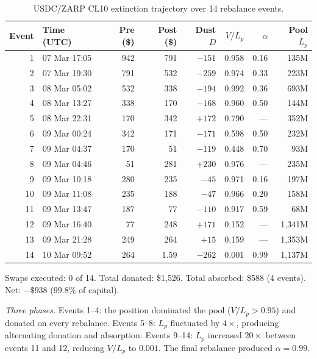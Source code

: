 \documentclass[11pt,a4paper]{article}
\begin{document}
\begin{table}[H]
\centering
\caption{USDC/ZARP CL10 extinction trajectory over 14 rebalance events.}\label{tab:zarp}
\begin{tabular}{@{}rlrrrrrr@{}}
\toprule
Event & Time (UTC) & Pre (\$) & Post (\$) & Dust $D$ & $V/L_p$ & $\alpha$ & Pool $L_p$ \\
\midrule
1  & 07 Mar 17:05 & 942 & 791  & $-151$              & 0.958          & 0.16            & 135M \\
2  & 07 Mar 19:30 & 791 & 532  & $-259$              & 0.974          & 0.33            & 223M \\
3  & 08 Mar 05:02 & 532 & 338  & $-194$              & 0.992          & 0.36            & 693M \\
4  & 08 Mar 13:27 & 338 & 170  & $-168$              & 0.960          & 0.50            & 144M \\
5  & 08 Mar 22:31 & 170 & 342  & $+172$     & 0.790          & ---             & 352M \\
6  & 09 Mar 00:24 & 342 & 171  & $-171$              & 0.598          & 0.50            & 232M \\
7  & 09 Mar 04:37 & 170 & 51   & $-119$              & 0.448          & 0.70            & 93M \\
8  & 09 Mar 04:46 & 51  & 281  & $+230$     & 0.976          & ---             & 235M \\
9  & 09 Mar 10:18 & 280 & 235  & $-45$               & 0.971          & 0.16            & 197M \\
10 & 09 Mar 11:08 & 235 & 188  & $-47$               & 0.966          & 0.20            & 158M \\
11 & 09 Mar 13:47 & 187 & 77   & $-110$              & 0.917          & 0.59            & 68M \\
12 & 09 Mar 16:40 & 77  & 248  & $+171$     & 0.152          & ---             & 1{,}341M \\
13 & 09 Mar 21:28 & 249 & 264  & $+15$               & 0.159          & ---             & 1{,}353M \\
14 & 10 Mar 09:52 & 264 & 1.59 & $-262$     & 0.001 & 0.99   & 1{,}137M \\
\bottomrule
\end{tabular}
\end{table}

Swaps executed: 0 of 14. Total donated: \$1{,}526. Total absorbed: \$588 (4 events). Net: $-\$938$ ($99.8\%$ of capital).

\emph{Three phases.} Events 1--4: the position dominated the pool ($V/L_p > 0.95$) and donated on every rebalance. Events 5--8: $L_p$ fluctuated by $4\times$, producing alternating donation and absorption. Events 9--14: $L_p$ increased $20\times$ between events 11 and 12, reducing $V/L_p$ to $0.001$. The final rebalance produced $\alpha = 0.99$.
\end{document}
